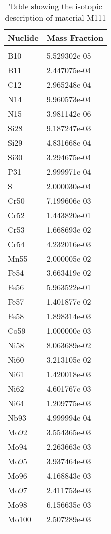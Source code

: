 \begin{centering}
\begin{longtable}[ht!]
\caption{Table showing the isotopic description of material M170}
\label{table:material_M170}
\end{longtable}\clearpage

\begin{longtable}[ht!]
{ p{} | p{} }
\hline
Nuclide & Mass Fraction\\
\hline
\\
B10 & 5.529302e-05\\
B11 & 2.447075e-04\\
C12 & 2.965248e-04\\
N14 & 9.960573e-04\\
N15 & 3.981142e-06\\
Si28 & 9.187247e-03\\
Si29 & 4.831668e-04\\
Si30 & 3.294675e-04\\
P31 & 2.999971e-04\\
S & 2.000030e-04\\
Cr50 & 7.199606e-03\\
Cr52 & 1.443820e-01\\
Cr53 & 1.668693e-02\\
Cr54 & 4.232016e-03\\
Mn55 & 2.000005e-02\\
Fe54 & 3.663419e-02\\
Fe56 & 5.963522e-01\\
Fe57 & 1.401877e-02\\
Fe58 & 1.898314e-03\\
Co59 & 1.000000e-03\\
Ni58 & 8.063689e-02\\
Ni60 & 3.213105e-02\\
Ni61 & 1.420018e-03\\
Ni62 & 4.601767e-03\\
Ni64 & 1.209775e-03\\
Nb93 & 4.999994e-04\\
Mo92 & 3.554365e-03\\
Mo94 & 2.263663e-03\\
Mo95 & 3.937464e-03\\
Mo96 & 4.168843e-03\\
Mo97 & 2.411753e-03\\
Mo98 & 6.156635e-03\\
Mo100 & 2.507289e-03\\

\caption{Table showing the isotopic description of material M111}
\label{table:material_M111}
\end{longtable}\clearpage


\end{centering}
